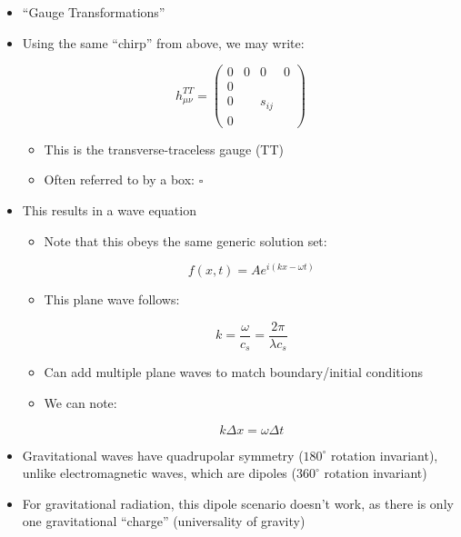 \begin{itemize}
\begin{itemize}
      \item ``Gauge Transformations''

      \item Using the same ``chirp'' from above, we may write:

        $$h_{\mu\nu}^{TT}=\left( \begin{matrix} 0 & 0 & 0 & 0\\ 0 & & &\\0 & & s_{ij} &\\ 0 & & & \end{matrix} \right)$$

        \begin{itemize}

          \item This is the transverse-traceless gauge (TT)

          \item Often referred to by a box: $\square$

        \end{itemize}

      \item This results in a wave equation

        \begin{itemize}

          \item Note that this obeys the same generic solution set:

            $$f(x,t)=Ae^{i(kx-\omega t)}$$

          \item This plane wave follows:

            $$k=\frac{\omega}{c_s}=\frac{2\pi}{\lambda c_s}$$

          \item Can add multiple plane waves to match boundary/initial conditions

          \item We can note:

            $$k\Delta x=\omega\Delta t$$

        \end{itemize}

      \item Gravitational waves have quadrupolar symmetry ($180^{\circ}$ rotation invariant), unlike electromagnetic waves, which are dipoles ($360^{\circ}$ rotation invariant)

      \item For gravitational radiation, this dipole scenario doesn't work, as there is only one gravitational ``charge''  (universality of gravity)


\end{itemize}
\end{itemize}

